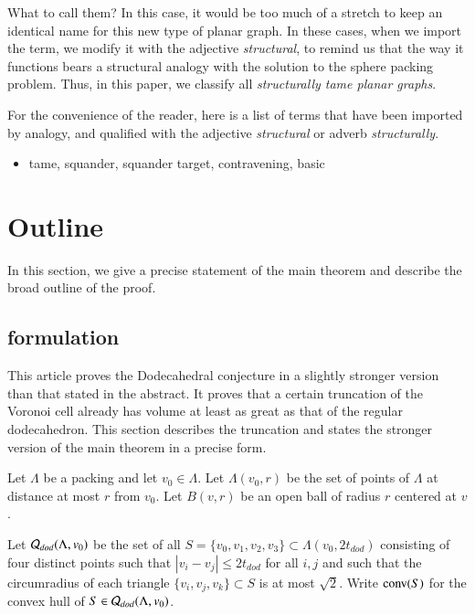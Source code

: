 What to call them?  In this case, it would be too much of a stretch
to keep an identical name for this new type of planar graph.
In these cases, when we import the term, we modify it with
the adjective {\it structural}, to remind us that the way it functions 
bears a structural
analogy with the solution to the sphere
packing problem.  Thus, in this paper, we classify all
{\it structurally tame planar graphs}.

For the convenience of the reader, here is a list of terms that
have been imported by analogy, and qualified with the adjective
{\it structural} or adverb {\it structurally}.

\begin{itemize}
\item tame, squander, squander target, contravening, basic
\end{itemize}




\section{Outline}

In this section, we give a precise statement of the main theorem
and describe the broad outline of the proof.


\subsection{formulation}\label{sec:form}

This article proves the Dodecahedral conjecture in a slightly
stronger version than that stated in the abstract.  It proves
that a certain truncation of the Voronoi cell already has volume
at least as great as that of the regular dodecahedron.  This
section describes the truncation and states the stronger version
of the main theorem in a precise form.

Let $\Lambda$ be a packing and let $v_0\in\Lambda$.
Let $\Lambda(v_0,r)$ be the set of points of $\Lambda$ at distance at most $r$ from $v_0$.
Let $B(v,r)$ be an open ball
of radius $r$ centered at $v$.  

Let ${\mathcal Q}_{dod}(\Lambda,v_0)$ 
be the set of all $S=\{v_0,v_1,v_2,v_3\}\subset\Lambda(v_0,2t_{dod})$
consisting of four distinct points such that $|v_i-v_j|\le 2t_{dod}$ for all $i,j$
and such that the circumradius of each triangle $\{v_i,v_j,v_k\}\subset S$ is at most
$\sqrt2$.   Write ${\operatorname{conv}}(S)$ for the convex hull of $S\in{\mathcal Q}_{dod}(\Lambda,v_0)$. 


